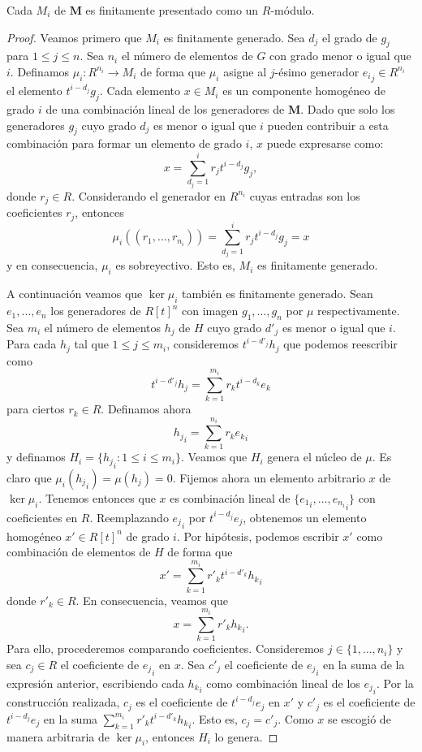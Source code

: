 \begin{lema}
	\label{lem:finit-pres}
	Cada \(M_i\) de \(\mathbf{M}\) es finitamente presentado como un \(R\)-módulo.
\end{lema}
\begin{proof}
	Veamos primero que \(M_i\) es finitamente generado. Sea \(d_j\) el grado de \(g_j\) para \(1 \leq j \leq n\). Sea \(n_i\) el número de elementos de \(G\) con grado menor o igual que \(i\). Definamos \(\mu_i : R^{n_i} \to M_i\) de forma que \(\mu_i\) asigne al \(j\)-ésimo generador \({e_i}_j \in R^{n_i}\) el elemento \(t^{i-d_j}g_j\). Cada elemento \(x \in M_i\) es un componente homogéneo de grado \(i\) de una combinación lineal de los generadores de \(\mathbf{M}\). Dado que solo los generadores \(g_j\) cuyo grado \(d_j\) es menor o igual que \(i\) pueden contribuir a esta combinación para formar un elemento de grado \(i\), \(x\) puede expresarse como:
	\[
	x = \sum_{d_j = 1}^i r_j t^{i-d_j} g_j,
	\]
	donde \(r_j \in R\). Considerando el generador en \(R^{n_i}\) cuyas entradas son los coeficientes \(r_j\), entonces
	\[
	\mu_i((r_1, \ldots, r_{n_i})) = \sum_{d_j = 1}^i r_j t^{i-d_j} g_j = x
	\]
	y en consecuencia, $\mu_i$ es sobreyectivo. Esto es, \(M_i\) es finitamente generado.
	
	A continuación veamos que \(\ker \mu_i\) también es finitamente generado. Sean \(e_1, \ldots, e_n\) los generadores de \(R[t]^n\) con imagen \(g_1, \ldots, g_n\) por \(\mu\) respectivamente. Sea \(m_i\) el número de elementos \(h_j\) de \(H\) cuyo grado \(d'_j\) es menor o igual que \(i\). Para cada \(h_j\) tal que \(1 \leq j \leq m_i\), consideremos \(t^{i-d'_j} h_j\) que podemos reescribir como
	\[
		t^{i-d'_j} h_j = \sum_{k=1}^{m_i} r_k t^{i-d_k} e_k
	\]
	para ciertos \(r_k \in R\). Definamos ahora 
	\[
		{h_j}_i = \sum_{k=1}^{n_i} r_k {e_k}_i
	\]
	y definamos \(H_i = \{ {h_j}_i : 1 \leq i \leq m_i \}\). Veamos que \(H_i\) genera el núcleo de \(\mu\). Es claro que \(\mu_i({h_j}_i) = \mu(h_j) = 0\). Fijemos ahora un elemento arbitrario \(x\) de \(\ker \mu_i\). Tenemos entonces que \(x\) es combinación lineal de \(\{{e_1}_i, \ldots, {e_{n_i}}_i\}\) con coeficientes en \(R\). Reemplazando \({e_j}_i\) por \(t^{i-d_j}e_j\), obtenemos un elemento homogéneo \(x' \in R[t]^n\) de grado \(i\). Por hipótesis, podemos escribir \(x'\) como combinación de elementos de \(H\) de forma que
	\[
		x' = \sum_{k=1}^{m_i} r'_k t^{i-d'_k} {h_k}_i
	\]
	donde \(r'_k \in R\). En consecuencia, veamos que
	\[
		x = \sum_{k=1}^{m_i} r'_k {h_k}_i.
	\]
	Para ello, procederemos comparando coeficientes. Consideremos \(j \in \{1, \ldots, n_i\}\) y sea \(c_j \in R\) el coeficiente de \({e_j}_i\) en \(x\). Sea \(c'_j\) el coeficiente de \({e_j}_i\) en la suma de la expresión anterior, escribiendo cada \({h_k}_i\) como combinación lineal de los \({e_j}_i\). Por la construcción realizada, \(c_j\) es el coeficiente de \(t^{i-d_j} e_j\) en \(x'\) y \(c'_j\) es el coeficiente de \(t^{i-d_j} e_j\) en la suma \(\sum_{k=1}^{m_i} r'_k t^{i-d'_k} {h_k}_i\). Esto es, \(c_j = c'_j\). Como \(x\) se escogió de manera arbitraria de \(\ker \mu_i\), entonces \(H_i\) lo genera.
\end{proof}

